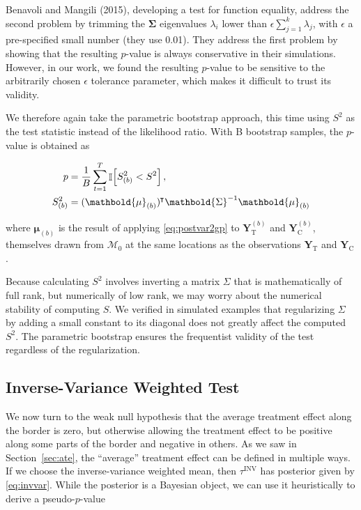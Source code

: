 \documentclass[letter]{article}
\DeclarePairedDelimiter{\curlybracket}{\lbrack}{\rbrack}
\newcommand{\cbr}[1]{\curlybracket*{#1}}
\DeclareMathOperator{\Ind}{\mathbb{I}}
\newcommand*{\trans}{^{\mkern-1.5mu\intercal}}
\newcommand{\treat}{\mathrm{T}}
\newcommand{\ctrol}{\mathrm{C}}
\newcommand{\Yvec}{\mathbold{Y}}
\newcommand{\yt}{\Yvec_{\treat}}
\newcommand{\yc}{\Yvec_{\ctrol}}
\newcommand{\muvec}{\mathbold{\mu}}
\newcommand{\invvar}{\tau^{\mathrm{INV}}}
\newcommand{\modnull}{\mathscr{M}_0}
\newcommand{\SigmaMat}{\mathbold{\Sigma}}
\begin{document}
Benavoli and Mangili (2015), developing a test for function equality, address the second problem by trimming the \(\SigmaMat\) eigenvalues \(\lambda_i\) lower than \(\epsilon \sum_{j=1}^k \lambda_j\), with \(\epsilon\) a pre-specified small number (they use 0.01).
They address the first problem by showing that the resulting \(p\)-value is always conservative in their simulations.
However, in our work, we found the resulting \(p\)-value to be sensitive to the arbitrarily chosen \(\epsilon\) tolerance parameter, which makes it difficult to trust its validity.

We therefore again take the parametric bootstrap approach, this time using \(S^2\) as the test statistic instead of the likelihood ratio.
With B bootstrap samples, the \(p\)-value is obtained as

\begin{equation}
\begin{split}
    p &= \frac{1}{B} \sum_{t=1}^T \Ind\cbr{S_{(b)}^2 < S^2}\,,\\
    S_{(b)}^2 &= (\muvec_{(b)} )\trans \SigmaMat^{-1} \muvec_{(b)}
\end{split}
\end{equation}

where \(\muvec_{(b)}\) is the result of applying \eqref{eq:postvar2gp} to \(\yt^{(b)}\) and \(\yc^{(b)}\), themselves drawn from \(\modnull\) at the same locations as the observations \(\yt\) and \(\yc\).

Because calculating \(S^2\) involves inverting a matrix \(\Sigma\) that is mathematically of full rank, but numerically of low rank, we may worry about the numerical stability of computing \(S\).
We verified in simulated examples that regularizing \(\Sigma\) by adding a small constant to its diagonal does not greatly affect the computed \(S^2\).
The parametric bootstrap ensures the frequentist validity of the test
regardless of the regularization.
    


    	\subsection{Inverse-Variance Weighted Test}\label{inverse-variance-weighted-test}

We now turn to the weak null hypothesis that the average treatment effect along the border is zero, but otherwise allowing the treatment effect to be positive along some parts of the border and negative in others.
As we saw in Section~\ref{sec:ate}, the ``average'' treatment effect can be defined in multiple ways.
If we choose the inverse-variance weighted mean, then \(\invvar\) has posterior given by \eqref{eq:invvar}.
While the posterior is a Bayesian object, we can use it heuristically to derive a pseudo-\(p\)-value
\end{document}
